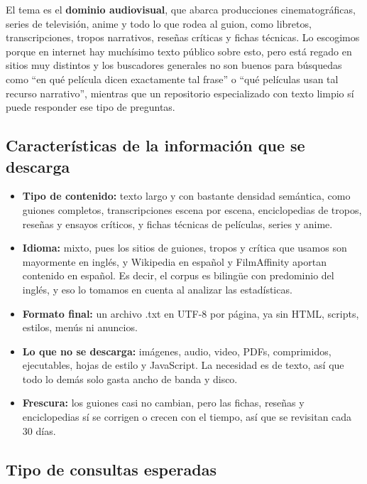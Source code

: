 \documentclass[11pt,spanish]{article}
\begin{document}
El tema es el \textbf{dominio audiovisual}, que abarca producciones cinematográficas, series de televisión, anime y todo lo que rodea al guion, como libretos, transcripciones, tropos narrativos, reseñas críticas y fichas técnicas. Lo escogimos porque en internet hay muchísimo texto público sobre esto, pero está regado en sitios muy distintos y los buscadores generales no son buenos para búsquedas como ``en qué película dicen exactamente tal frase'' o ``qué películas usan tal recurso narrativo'', mientras que un repositorio especializado con texto limpio sí puede responder ese tipo de preguntas.

\subsection{Características de la información que se descarga}

\begin{itemize}[label=\textbullet, leftmargin=*]
    \item \textbf{Tipo de contenido:} texto largo y con bastante densidad semántica, como guiones completos, transcripciones escena por escena, enciclopedias de tropos, reseñas y ensayos críticos, y fichas técnicas de películas, series y anime.
    \item \textbf{Idioma:} mixto, pues los sitios de guiones, tropos y crítica que usamos son mayormente en inglés, y Wikipedia en español y FilmAffinity aportan contenido en español. Es decir, el corpus es bilingüe con predominio del inglés, y eso lo tomamos en cuenta al analizar las estadísticas.
    \item \textbf{Formato final:} un archivo .txt en UTF-8 por página, ya sin HTML, scripts, estilos, menús ni anuncios.
    \item \textbf{Lo que no se descarga:} imágenes, audio, video, PDFs, comprimidos, ejecutables, hojas de estilo y JavaScript. La necesidad es de texto, así que todo lo demás solo gasta ancho de banda y disco.
    \item \textbf{Frescura:} los guiones casi no cambian, pero las fichas, reseñas y enciclopedias sí se corrigen o crecen con el tiempo, así que se revisitan cada 30 días.
\end{itemize}

\subsection{Tipo de consultas esperadas}
\end{document}
